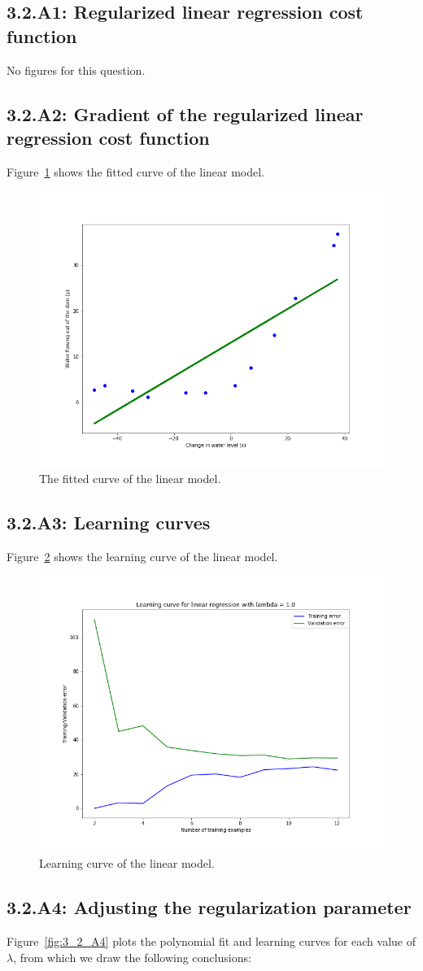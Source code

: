 \documentclass[english,11pt]{article}
\begin{document}
\subsection*{3.2.A1: Regularized linear regression cost function}
No figures for this question.

\subsection*{3.2.A2: Gradient of the regularized linear regression cost function}
Figure~\ref{fig:3_2_A2} shows the fitted curve of the linear model.
\begin{figure}[h]
\centering
\includegraphics[width=.5\textwidth]{../hw1/part2/fig3_2_A2_Linear.png}
\caption{The fitted curve of the linear model.}
\label{fig:3_2_A2}
\end{figure}

\subsection*{3.2.A3: Learning curves}
Figure~\ref{fig:3_2_A3} shows the learning curve of the linear model.
\begin{figure}[h]
\centering
\includegraphics[width=.5\textwidth]{../hw1/part2/fig3_2_A3_Learning_curve_labdta_0.png}
\caption{Learning curve of the linear model.}
\label{fig:3_2_A3}
\end{figure}

\subsection*{3.2.A4: Adjusting the regularization parameter}
Figure~\ref{fig:3_2_A4} plots the polynomial fit and learning curves for each  value of $\lambda$, from which we draw the following conclusions:
\end{document}
